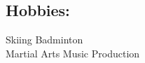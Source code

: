 \documentclass[letterpaper]{kevin-resume} %
\begin{document}
{\begin{minipage}[t]{0.30\textwidth}
\sectionspace %
\subsection{Hobbies:}
Skiing \textbullet{} 
Badminton \\
Martial Arts \textbullet{} 
Music Production

\hspace{5mm}
\end{minipage}} %








\end{document}
